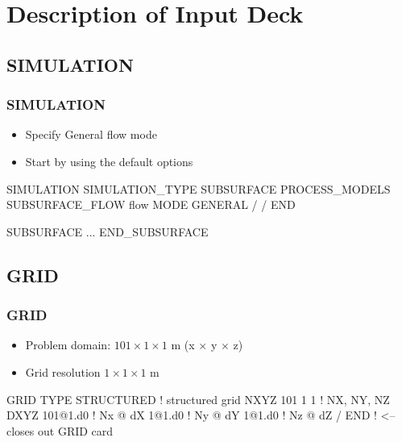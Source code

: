 \documentclass{beamer}
\newcommand\bluecomment[1]{{{\color{blue} #1}}}
\begin{document}
\section{Description of Input Deck}

\subsection{SIMULATION}

\begin{frame}[fragile]\frametitle{SIMULATION}

\begin{itemize}
\item Specify General flow mode
\item Start by using the default options
\end{itemize}


\begin{semiverbatim}

SIMULATION
  SIMULATION_TYPE SUBSURFACE
  PROCESS_MODELS
    SUBSURFACE_FLOW flow
      MODE GENERAL
    /
  /
END

SUBSURFACE
 ...
END_SUBSURFACE
\end{semiverbatim}

\end{frame}

\subsection{GRID}
\begin{frame}\frametitle{GRID}

\begin{itemize}
  \item Problem domain: $101 \times 1 \times 1$ m (x $\times$ y $\times$ z)
  \item Grid resolution $1 \times 1 \times 1$ m
\end{itemize}

\begin{semiverbatim}
GRID
  TYPE STRUCTURED        \bluecomment{! structured grid}
  NXYZ 101 1 1           \bluecomment{! NX, NY, NZ}
  DXYZ            
    101@1.d0   \bluecomment{! Nx @ dX}
    1@1.d0  \bluecomment{! Ny @ dY}
    1@1.d0  \bluecomment{! Nz @ dZ}
  /  
END  \bluecomment{! <-- closes out GRID card}
\end{semiverbatim}

\end{frame}
\end{document}
